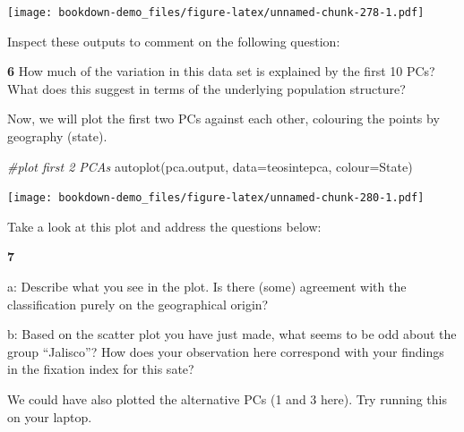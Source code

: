 \documentclass[
]{book}
\makeatletter
\newenvironment{Shaded}{\begin{snugshade}}{\end{snugshade}}
\newcommand{\AttributeTok}[1]{\textcolor[rgb]{0.77,0.63,0.00}{#1}}
\newcommand{\CommentTok}[1]{\textcolor[rgb]{0.56,0.35,0.01}{\textit{#1}}}
\newcommand{\FunctionTok}[1]{\textcolor[rgb]{0.00,0.00,0.00}{#1}}
\newcommand{\NormalTok}[1]{#1}
\newcommand{\StringTok}[1]{\textcolor[rgb]{0.31,0.60,0.02}{#1}}
\newenvironment{kframe}{%
\medskip{}
\setlength{\fboxsep}{.8em}
 \def\at@end@of@kframe{}%
 \ifinner\ifhmode%
  \def\at@end@of@kframe{\end{minipage}}%
  \begin{minipage}{\columnwidth}%
 \fi\fi%
 \def\FrameCommand##1{\hskip\@totalleftmargin \hskip-\fboxsep
 \colorbox{shadecolor}{##1}\hskip-\fboxsep
     \hskip-\linewidth \hskip-\@totalleftmargin \hskip\columnwidth}%
 \MakeFramed {\advance\hsize-\width
   \@totalleftmargin\z@ \linewidth\hsize
   \@setminipage}}%
 {\par\unskip\endMakeFramed%
 \at@end@of@kframe}
\newenvironment{rmdblock}[1]
  {
  \begin{itemize}
  \renewcommand{\labelitemi}{
    \raisebox{-.7\height}[0pt][0pt]{
      {\setkeys{Gin}{width=3em,keepaspectratio}\texttt{[image: images/\#1]}}
    }
  }
  \setlength{\fboxsep}{1em}
  \begin{kframe}
  \item
  }
  {
  \end{kframe}
  \end{itemize}
  }
\newenvironment{rmdquiz}
  {\begin{rmdblock}{quiz}}
  {\end{rmdblock}}
\makeatother
\begin{document}
\texttt{[image: bookdown-demo\_files/figure-latex/unnamed-chunk-278-1.pdf]}

Inspect these outputs to comment on the following question:

\begin{rmdquiz}
\textbf{6} How much of the variation in this data set is explained by the first 10 PCs? What does this suggest in terms of the underlying population structure?
\end{rmdquiz}

Now, we will plot the first two PCs against each other, colouring the points by geography (state).

\begin{Shaded}
\begin{Highlighting}[]
\CommentTok{\#plot first 2 PCAs}
\FunctionTok{autoplot}\NormalTok{(pca.output, }\AttributeTok{data=}\NormalTok{teosintepca, }\AttributeTok{colour=}\StringTok{\textquotesingle{}State\textquotesingle{}}\NormalTok{)}
\end{Highlighting}
\end{Shaded}

\texttt{[image: bookdown-demo\_files/figure-latex/unnamed-chunk-280-1.pdf]}

Take a look at this plot and address the questions below:

\begin{rmdquiz}
\textbf{7}

a: Describe what you see in the plot. Is there (some) agreement with the classification purely on the geographical origin?

b: Based on the scatter plot you have just made, what seems to be odd about the group ``Jalisco''? How does your observation here correspond with your findings in the fixation index for this sate?
\end{rmdquiz}

We could have also plotted the alternative PCs (1 and 3 here). Try running this on your laptop.
\end{document}
